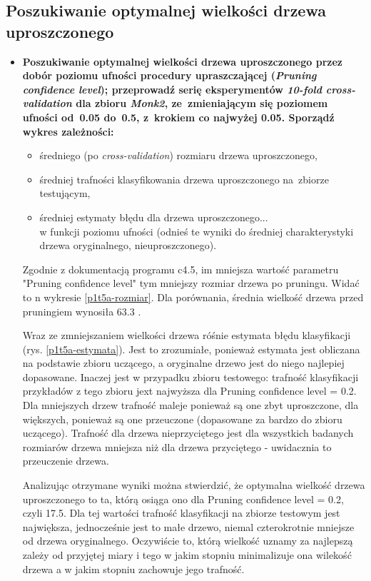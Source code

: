 \subsection{Poszukiwanie optymalnej wielkości drzewa uproszczonego}

\begin{itemize}
\item \textbf{Poszukiwanie optymalnej wielkości drzewa uproszczonego przez dobór poziomu ufności procedury upraszczającej (\emph{Pruning confidence level}); przeprowadź serię eksperymentów \emph{10-fold cross-validation} dla zbioru \emph{Monk2}, ze~zmieniającym się poziomem ufności od~0.05 do~0.5, z~krokiem co najwyżej 0.05. Sporządź wykres zależności:}

\begin{itemize}
	\item średniego (po \emph{cross-validation}) rozmiaru drzewa uproszczonego,  
	\item średniej trafności klasyfikowania drzewa uproszczonego na~zbiorze testującym,
	\item średniej estymaty błędu dla drzewa uproszczonego...
\\w funkcji poziomu ufności (odnieś te wyniki do średniej charakterystyki drzewa oryginalnego, nieuproszczonego).
\end{itemize}

Zgodnie z dokumentacją programu c4.5, im mniejsza wartość parametru "Pruning confidence level" tym mniejszy rozmiar drzewa po pruningu. Widać to n wykresie \ref{p1t5a-rozmiar}. Dla porównania, średnia wielkość drzewa przed pruningiem wynosiła $ 63.3 $ .

Wraz ze zmniejszaniem wielkości drzewa róśnie estymata błędu klasyfikacji (rys. \ref{p1t5a-estymata}). Jest to zrozumiałe, ponieważ estymata jest obliczana na podstawie zbioru uczącego, a oryginalne drzewo jest do niego najlepiej dopasowane. Inaczej jest w przypadku zbioru testowego: trafność klasyfikacji przykładów z tego zbioru jext najwyższa dla Pruning confidence level = 0.2. Dla mniejszych drzew trafność maleje ponieważ są one zbyt uproszczone, dla większych, ponieważ są one przeuczone (dopasowane za bardzo do zbioru uczącego). Trafność dla drzewa nieprzyciętego jest dla wszystkich badanych rozmiarów drzewa mniejsza niż dla drzewa przyciętego - uwidacznia to przeuczenie drzewa.

Analizując otrzymane wyniki można stwierdzić, że optymalna wielkość drzewa uproszczonego to ta, którą osiąga ono dla Pruning confidence level = 0.2, czyli 17.5. Dla tej wartości trafność klasyfikacji na zbiorze testowym jest największa, jednocześnie jest to małe drzewo, niemal czterokrotnie mniejsze od drzewa oryginalnego. Oczywiście to, którą wielkość uznamy za najlepszą zależy od przyjętej miary i tego w jakim stopniu minimalizuje ona wilekość drzewa a w jakim stopniu zachowuje jego trafność.


\end{itemize}
